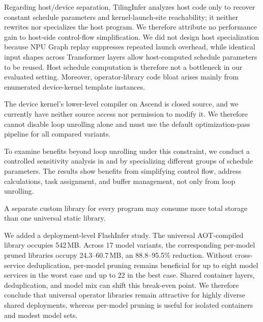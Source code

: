 \authorresponse
Regarding host/device separation, TilingInfer analyzes host code only to
recover constant schedule parameters and kernel-launch-site reachability; it
neither rewrites nor specializes the host program.  We therefore attribute no
performance gain to host-side control-flow simplification.  We did not design
host specialization because NPU Graph replay suppresses repeated launch
overhead, while identical input shapes across Transformer layers allow
host-computed schedule parameters to be reused.  Host schedule computation is
therefore not a bottleneck in our evaluated setting.  Moreover,
operator-library code bloat arises mainly from enumerated device-kernel
template instances.

The device kernel's lower-level compiler on Ascend is closed source, and we currently
have neither source access nor permission to modify it.  We therefore cannot
disable loop unrolling alone and must use the default optimization-pass
pipeline for all compared variants.

To examine benefits beyond loop unrolling under this constraint, we conduct a controlled sensitivity 
analysis in  and  by specializing different groups of schedule parameters. 
The results show benefits from simplifying control flow, address calculations, task assignment, and buffer management, not only from loop unrolling. 



{A separate custom library for every program may consume more total storage
than one universal static library.}

\authorresponse
We added a deployment-level FlashInfer study.  The universal AOT-compiled
library occupies 542\,MB.  Across 17 model variants, the corresponding
per-model pruned libraries occupy 24.3--60.7\,MB, an 88.8--95.5\%
reduction.  Without cross-service deduplication, per-model pruning
remains beneficial for up to eight model services in the worst case and up to
22 in the best case.  Shared container layers, deduplication, and model mix can
shift this break-even point.  We therefore conclude that universal operator
libraries remain attractive for highly diverse shared deployments, whereas
per-model pruning is useful for isolated containers and modest model sets.


